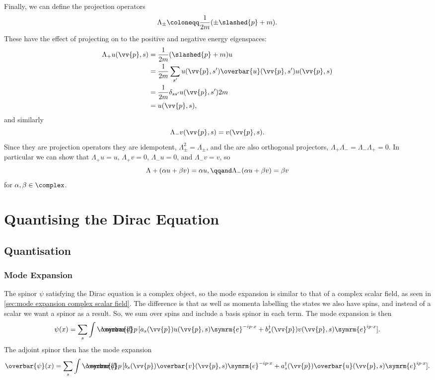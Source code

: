 \documentclass[fleqn]{NotesClass}
\newcommand{\e}{\symrm{e}}
\newcommand{\hermit}{{\dagger}}
\newcommand{\dbar}[1][0.0]{\ThisStyle{\ensurestackMath{%
            \stackengine{#1\LMex}{\SavedStyle \symrm{d}}{\SavedStyle\overbar{}%
                \mkern2.25mu}{O}{r}{F}{F}{L}}}}
\newcommand{\invariantmeasure}[1]{%
    \mathchoice{\dbar #1}{\dbar #1}{\dbar[.05] #1}{\dbar[.06] #1}
}
\newcommand{\diracadjoint}[1]{\overbar{#1}}
\begin{document}
    Finally, we can define the projection operators
    \begin{equation}
        \Lambda_{\pm} \coloneqq \frac{1}{2m}(\pm \slashed{p} + m).
    \end{equation}
    These have the effect of projecting on to the positive and negative energy eigenspaces:
    \begin{align}
        \Lambda_{+} u(\vv{p}, s) &= \frac{1}{2m}(\slashed{p} + m)u\\
        &= \frac{1}{2m} \sum_{s'} u(\vv{p}, s')\diracadjoint{u}(\vv{p}, s') u(\vv{p}, s)\\
        &= \frac{1}{2m} \delta_{ss'} u(\vv{p}, s') 2m\\
        &= u(\vv{p}, s),
    \end{align}
    and similarly
    \begin{equation}
        \Lambda_- v(\vv{p}, s) = v(\vv{p}, s).
    \end{equation}
    Since they are projection operators they are idempotent, \(\Lambda_{\pm}^2 = \Lambda_{\pm}\), and the are also orthogonal projectors, \(\Lambda_{+}\Lambda_{-} = \Lambda_{-}\Lambda_{+} = 0\).
    In particular we can show that \(\Lambda_+ u = u\), \(\Lambda_{+}v = 0\), \(\Lambda_- u = 0\), and \(\Lambda_{-}v = v\), so
    \begin{equation}
        \Lambda+ (\alpha u + \beta v) = \alpha u, \qqand \Lambda_- (\alpha u + \beta v) = \beta v
    \end{equation}
    for \(\alpha, \beta \in \complex\).
    
    \part{Quantising the Dirac Equation}
    \chapter{Quantisation}
    \section{Mode Expansion}
    The spinor \(\psi\) satisfying the Dirac equation is a complex object, so the mode expansion is similar to that of a complex scalar field, as seen in \cref{sec:mode expansion complex scalar field}.
    The difference is that as well as momenta labelling the states we also have spins, and instead of a scalar we want a spinor as a result.
    So, we sum over spins and include a basis spinor in each term.
    The mode expansion is then
    \begin{equation}
        \psi(x) = \sum_s \int \invariantmeasure{p} \, [a_s(\vv{p}) u(\vv{p}, s) \e^{-ip \cdot x} + b_s^\hermit(\vv{p}) v(\vv{p}, s) \e^{ip\cdot x}].
    \end{equation}
    The adjoint spinor then has the mode expansion
    \begin{equation}
        \diracadjoint{\psi}(x) = \sum_s \int \invariantmeasure{p} \, [b_s(\vv{p}) \diracadjoint{v}(\vv{p}, s) \e^{-ip\cdot x} + a_s^\hermit(\vv{p}) \diracadjoint{u}(\vv{p}, s) \e^{ip\cdot x}].
    \end{equation}
    
\end{document}

